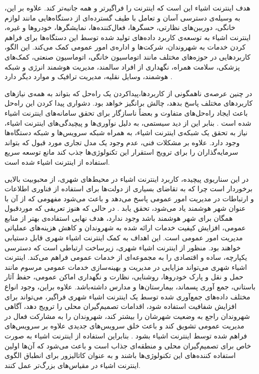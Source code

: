     هدف اینترنت اشیاء این است که اینترنت را فراگیرتر و همه جانبه‌تر کند.
    علاوه بر این، به وسیله‌ی دسترسی آسان و تعامل با طیف گسترده‌ای از دستگاه‌هایی مانند لوازم خانگی، دوربین‌های نظارتی، حسگر‌ها، فعال‌کننده‌ها، نمایشگر‌ها، خودرو‌ها و غیره، اینترنت اشیاء به توسعه‌ی کاربرد داده‌های تولید شده توسط این دستگاه‌ها برای فراهم کردن خدمات به شهروندان، شرکت‌ها و اداره‌ی امور عمومی کمک می‌کند.
    این الگو، کاربرد‌هایی در حوزه‌های مختلف مانند اتوماسیون خانگی، اتوماسیون صنعتی، کمک‌های پزشکی، سلامت همراه، نگهداری از افراد سالمند، مدیریت هوشمند انرژی و شبکه هوشمند، وسایل نقلیه، مدیریت ترافیک و موارد دیگر دارد \cite{bellavista2013convergence}.
    
    در چنین عرصه‌ی ناهمگونی از کاربرد‌ها،پیداکردن یک راه‌حل که بتواند به همه‌ی نیاز‌های کاربرد‌های مختلف پاسخ بدهد، چالش برانگیز خواهد بود.
    دشواری پیدا کردن این راه‌حل باعث ایجاد راه‌حل‌های متفاوت و بعضاً ناسازگار برای تحقق سامانه‌های اینترنت اشیاء شده است \cite{zanella2014internet}.
    بنابر این از دید سیستمی، به دلیل نوآوری‌ها و پیچیدگی‌های اینترنت اشیاء، نیاز به تحقق یک شبکه‌ی اینترنت اشیاء، به همراه شبکه سرویس‌ها و شبکه دستگاه‌ها وجود دارد.
    علاوه بر مشکلات فنی، عدم وجود یک مدل تجاری مورد قبول که بتواند سرمایه‌گذاران را برای ترویج استقرار این تکنولوژی‌ها جذب کند مانع توسعه سریع استفاده از اینترنت اشیاء شده است\cite{laya2013investing}.

    در این سناریوی پیچیده، کاربرد اینترنت اشیاء در محیط‌های شهری، از محبوبیت بالایی برخوردار است چرا که به تقاضای بسیاری از دولت‌ها برای استفاده از فناوری‌ اطلاعات و ارتباطات در مدیریت امور عمومی پاسخ می‌دهد و باعث می‌شود مفهومی که از آن با عنوان شهر هوشمند یاد می‌شود، تحقق یابد \cite{schaffers2011smart}.
    در حالی که هنوز تعریفی که موردقبول همگان برای شهر هوشمند باشد وجود ندارد، هدف نهایی استفاده‌ی بهتر از منابع عمومی، افزایش کیفیت خدمات ارائه شده به شهروندان و کاهش هزینه‌های عملیاتی مدیریت امور عمومی است. 
    این اهداف به کمک اینترنت اشیاء شهری قابل دستیابی خواهند بود.
    منظور از اینترنت اشیاء شهری، زیرساخت ارتباطی است که دسترسی یکپارچه، ساده و اقتصادی را به مجموعه‌ای از خدمات عمومی فراهم می‌کند.
    اینترنت اشیاء شهری می‌تواند مزایایی در مدیریت و بهینه‌سازی خدمات عمومی مرسوم مانند حمل و نقل و پارک خودرو‌ها، روشنایی، نظارت و نگهداری اماکن عمومی، حفظ آثار باستانی، جمع آوری پسماند، بیمارستان‌ها و مدارس داشته‌باشد.
    علاوه براین، وجود انواع مختلف داده‌های جمع‌آوری شده توسط یک اینترنت اشیاء شهری فراگیر، می‌تواند برای افزایش شفافیت استفاده شود، اقدامات تصمیم‌گیران محلی را ترویج دهد، آگاهی شهروندان راجع به وضعیت شهرشان را بیشتر کند، شهروندان را به مشارکت فعال در مدیریت عمومی تشویق کند و باعث خلق سرویس‌های جدیدی علاوه بر سرویس‌های فراهم شده توسط اینترنت اشیاء بشود \cite{cuff2008urban}.
    بنابراین استفاده از اینترنت اشیاء به صورت خاص برای تصمیم‌گیران محلی و منطقه‌ای جذاب است و باعث می‌شود که آن‌ها اولین استفاده کننده‌های این تکنولوژی‌ها باشند و به عنوان کاتالیزور برای انطباق الگوی اینترنت اشیاء در مقیاس‌های بزرگ‌تر عمل کنند.

